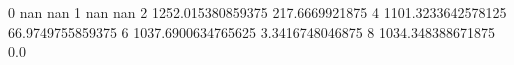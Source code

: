 0 nan nan
1 nan nan
2 1252.015380859375 217.6669921875
4 1101.3233642578125 66.9749755859375
6 1037.6900634765625 3.3416748046875
8 1034.348388671875 0.0
